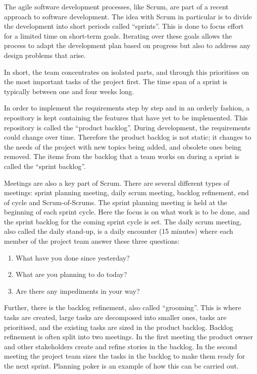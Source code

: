 The agile software development processes, like Scrum, are part of a recent approach to software development. The idea with Scrum in particular is to divide the development into short periods called ``sprints''. This is done to focus effort for a limited time on short-term goals. Iterating over these goals allows the process to adapt the development plan based on progress but also to address any design problems that arise.

In short, the team concentrates on isolated parts, and through this prioritises on the most important tasks of the project first. The time span of a sprint is typically between one and four weeks long.

In order to implement the requirements step by step and in an orderly fashion, a repository is kept containing the features that have yet to be implemented. This repository is called the ``product backlog''. During development, the requirements could change over time. Therefore the product backlog is not static; it changes to the needs of the project with new topics being added, and obsolete ones being removed. The items from the backlog that a team works on during a sprint is called the ``sprint backlog''.

Meetings are also a key part of Scrum. There are several different types of meetings: sprint planning meeting, daily scrum meeting, backlog refinement, end of cycle and Scrum-of-Scrums. The sprint planning meeting is held at the beginning of each sprint cycle. Here the focus is on what work is to be done, and the sprint backlog for the coming sprint cycle is set. The daily scrum meeting, also called the daily stand-up, is a daily encounter (15 minutes) where each member of the project team answer these three questions:

\begin{enumerate}
  \item What have you done since yesterday?
  \item What are you planning to do today?
  \item Are there any impediments in your way?
\end{enumerate}

Further, there is the backlog refinement, also called ``grooming''. This is where tasks are created, large tasks are decomposed into smaller ones, tasks are prioritised, and the existing tasks are sized in the product backlog. Backlog refinement is often split into two meetings. In the first meeting the product owner and other stakeholders create and refine stories in the backlog. In the second meeting the project team sizes the tasks in the backlog to make them ready for the next sprint. Planning poker is an example of how this can be carried out.

